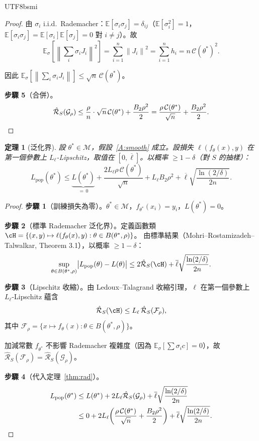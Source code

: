 \documentclass[11pt,a4paper]{article}
\newtheorem{theorem}{定理}
\theoremstyle{definition}
\newcommand{\E}{\mathbb{E}}
\newcommand{\cM}{\mathcal{M}}
\newcommand{\cC}{\mathcal{C}}
\newcommand{\cF}{\mathcal{F}}
\newcommand{\cG}{\mathcal{G}}
\newcommand{\norm}[1]{\left\|#1\right\|}
\begin{document}
\begin{CJK}{UTF8}{bsmi}
\begin{proof}
  由 $\sigma_i$ i.i.d.\ Rademacher：$\E[\sigma_i\sigma_j]=\delta_{ij}$（$\E[\sigma_i^2]=1$，$\E[\sigma_i\sigma_j]=\E[\sigma_i]\E[\sigma_j]=0$ 對 $i\neq j$）。故
  \[
    \E_\sigma\!\left[\norm{\sum_i\sigma_iJ_i}^2\right]=\sum_{i=1}^n\norm{J_i}^2=\sum_{i=1}^n h_i=n\,\cC(\theta^*)^2.
  \]

  因此 $\E_\sigma[\norm{\sum_i\sigma_iJ_i}]\leq\sqrt{n}\,\cC(\theta^*)$。

  \textbf{步驟 5}（合併）。
  \[
    \hat{\mathcal{R}}_S(\cG_\rho)\leq\frac{\rho}{n}\cdot\sqrt{n}\,\cC(\theta^*)+\frac{B_2\rho^2}{2}
    =\frac{\rho\,\cC(\theta^*)}{\sqrt{n}}+\frac{B_2\rho^2}{2}. \qedhere
  \]
\end{proof}

\begin{theorem}[泛化界]\label{thm:gen}
  設 $\theta^*\in\cM$，假設~\ref{A:smooth} 成立。設損失 $\ell(f_\theta(x),y)$ 在第一個參數上 $L_\ell$-Lipschitz，取值在 $[0,\overline{\ell}]$。以概率 $\geq 1-\delta$（對 $S$ 的抽樣）：
  \begin{equation}\label{eq:gen}
    L_{\mathrm{pop}}(\theta^*)\leq\underbrace{L(\theta^*)}_{=\,0}+\frac{2L_\ell\rho\,\cC(\theta^*)}{\sqrt{n}}+L_\ell B_2\rho^2+\overline{\ell}\sqrt{\frac{\ln(2/\delta)}{2n}}.
  \end{equation}
\end{theorem}

\begin{proof}
  \textbf{步驟 1}（訓練損失為零）。$\theta^*\in\cM$，$f_{\theta^*}(x_i)=y_i$，$L(\theta^*)=0$。

  \textbf{步驟 2}（標準 Rademacher 泛化界）。定義函數類
  $\cH=\{(x,y)\mapsto\ell(f_\theta(x),y):\theta\in B(\theta^*,\rho)\}$。
  由標準結果（Mohri--Rostamizadeh--Talwalkar, Theorem 3.1），以概率 $\geq 1-\delta$：
  \[
    \sup_{\theta\in B(\theta^*,\rho)}\bigl|L_{\mathrm{pop}}(\theta)-L(\theta)\bigr|
    \leq 2\hat{\mathcal{R}}_S(\cH)+\overline{\ell}\sqrt{\frac{\ln(2/\delta)}{2n}}.
  \]

  \textbf{步驟 3}（Lipschitz 收縮）。由 Ledoux--Talagrand 收縮引理，$\ell$ 在第一個參數上 $L_\ell$-Lipschitz 蘊含
  \[
    \hat{\mathcal{R}}_S(\cH)\leq L_\ell\,\hat{\mathcal{R}}_S(\cF_\rho),
  \]
  其中 $\cF_\rho=\{x\mapsto f_\theta(x):\theta\in B(\theta^*,\rho)\}$。

  加減常數 $f_{\theta^*}$ 不影響 Rademacher 複雜度（因為 $\E_\sigma[\sum\sigma_i c]=0$），故 $\hat{\mathcal{R}}_S(\cF_\rho)=\hat{\mathcal{R}}_S(\cG_\rho)$。

  \textbf{步驟 4}（代入定理~\ref{thm:rad}）。
  \begin{align*}
    L_{\mathrm{pop}}(\theta^*)
    &\leq L(\theta^*)+2L_\ell\hat{\mathcal{R}}_S(\cG_\rho)+\overline{\ell}\sqrt{\frac{\ln(2/\delta)}{2n}}\\
    &\leq 0+2L_\ell\!\left(\frac{\rho\,\cC(\theta^*)}{\sqrt{n}}+\frac{B_2\rho^2}{2}\right)+\overline{\ell}\sqrt{\frac{\ln(2/\delta)}{2n}}.
    \qedhere
  \end{align*}
\end{proof}


\end{CJK}
\end{document}
